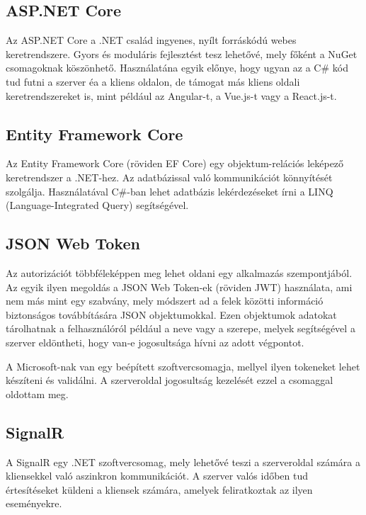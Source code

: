 \subsection{ASP.NET Core}
Az ASP.NET Core a .NET család ingyenes, nyílt forráskódú webes keretrendszere. Gyors és moduláris fejlesztést tesz lehetővé, mely főként a NuGet csomagoknak köszönhető.
Használatána egyik előnye, hogy ugyan az a C\# kód tud futni a szerver éa a kliens oldalon, de támogat más kliens oldali keretrendszereket is, mint például az Angular-t, a Vue.js-t
vagy a React.js-t.

\subsection{Entity Framework Core}
Az Entity Framework Core (röviden EF Core) egy objektum-relációs leképező keretrendszer a .NET-hez. Az adatbázissal való kommunikációt könnyítését szolgálja. 
Használatával C\#-ban lehet adatbázis lekérdezéseket írni a LINQ (Language-Integrated Query) segítségével.

\subsection{JSON Web Token}
Az autorizációt többféleképpen meg lehet oldani egy alkalmazás szempontjából. Az egyik ilyen megoldás a JSON Web Token-ek (röviden JWT) \cite{jwt} használata,
ami nem más mint egy szabvány, mely módszert ad a felek közötti információ biztonságos továbbítására JSON objektumokkal.
Ezen objektumok adatokat tárolhatnak a felhasználóról például a neve vagy a szerepe, melyek segítségével a szerver eldöntheti, 
hogy van-e jogosultsága hívni az adott végpontot.

A Microsoft-nak van egy beépített szoftvercsomagja, mellyel ilyen tokeneket lehet készíteni és validálni.
A szerveroldal jogosultság kezelését ezzel a csomaggal oldottam meg.

\subsection{SignalR}
A SignalR egy .NET szoftvercsomag, mely lehetővé teszi a szerveroldal számára a kliensekkel való aszinkron kommunikációt.
A szerver valós időben tud értesítéseket küldeni a kliensek számára, amelyek feliratkoztak az ilyen eseményekre.


